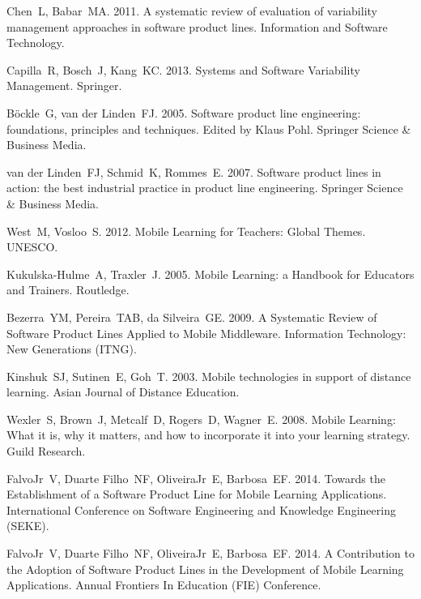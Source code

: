 \documentclass{kais}
\begin{document}
\begin{thebibliography}{99}

 Chen~L, Babar~MA. 2011. A systematic review of evaluation of variability management approaches in software product lines. Information and Software Technology.

 Capilla~R, Bosch~J, Kang~KC. 2013. Systems and Software Variability Management. Springer.

 B\"{o}ckle~G, van der Linden~FJ. 2005. Software product line engineering: foundations, principles and techniques. Edited by Klaus Pohl. Springer Science \& Business Media.

 van der Linden~FJ, Schmid~K, Rommes~E. 2007. Software product lines in action: the best industrial practice in product line engineering. Springer Science \& Business Media.

 West~M, Vosloo~S. 2012. Mobile Learning for Teachers: Global Themes. UNESCO.

 Kukulska-Hulme~A, Traxler~J. 2005. Mobile Learning: a Handbook for Educators and Trainers. Routledge.

 Bezerra~YM, Pereira~TAB, da Silveira~GE. 2009. A Systematic Review of Software Product Lines Applied to Mobile Middleware. Information Technology: New Generations (ITNG).

 Kinshuk~SJ, Sutinen~E, Goh~T. 2003. Mobile technologies in support of distance learning. Asian Journal of Distance Education.

 Wexler~S, Brown~J, Metcalf~D, Rogers~D, Wagner~E. 2008. Mobile Learning: What it is, why it matters, and how to incorporate it into your learning strategy. Guild Research.

 FalvoJr~V, Duarte Filho~NF, OliveiraJr~E, Barbosa~EF. 2014. Towards the Establishment of a Software Product Line for Mobile Learning Applications. International Conference on Software Engineering and Knowledge Engineering (SEKE).

 FalvoJr~V, Duarte Filho~NF, OliveiraJr~E, Barbosa~EF. 2014. A Contribution to the Adoption of Software Product Lines in the Development of Mobile Learning Applications. Annual Frontiers In Education (FIE) Conference.


\end{thebibliography}
\end{document}
